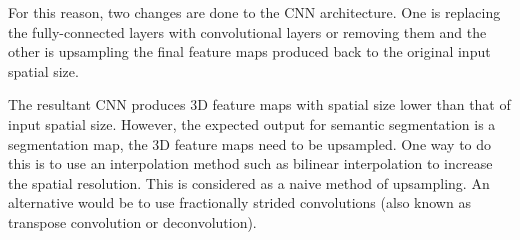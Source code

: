 For this reason, two changes are done to the CNN architecture. One is replacing the fully-connected layers with convolutional layers or removing them and the other is upsampling the final feature maps produced back to the original input spatial size. 

The resultant CNN produces 3D feature maps with spatial size lower than that of input spatial size. However, the expected output for semantic segmentation is a segmentation map, the 3D feature maps need to be upsampled. One way to do this is to use an interpolation method such as bilinear interpolation to increase the spatial resolution. This is considered as a naive method of upsampling. An alternative would be to use fractionally strided convolutions (also known as transpose convolution or deconvolution). 
